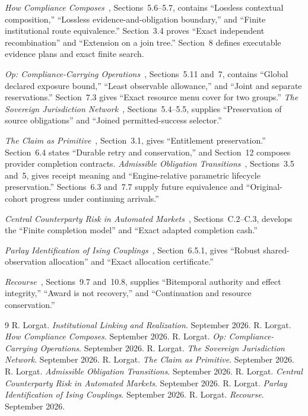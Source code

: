 \documentclass{momentum}
\begin{document}
\emph{How Compliance Composes}~\cite{compliance}, Sections~5.6--5.7, contains ``Lossless contextual composition,'' ``Lossless evidence-and-obligation boundary,'' and ``Finite institutional route equivalence.''
Section~3.4 proves ``Exact independent recombination'' and ``Extension on a join tree.''
Section~8 defines executable evidence plans and exact finite search.

\emph{Op: Compliance-Carrying Operations}~\cite{op}, Sections~5.11 and~7, contains ``Global declared exposure bound,'' ``Least observable allowance,'' and ``Joint and separate reservations.''
Section~7.3 gives ``Exact resource menu cover for two groups.''
\emph{The Sovereign Jurisdiction Network}~\cite{recognition}, Sections~5.4--5.5, supplies ``Preservation of source obligations'' and ``Joined permitted-success selector.''

\emph{The Claim as Primitive}~\cite{claim}, Section~3.1, gives ``Entitlement preservation.''
Section~6.4 states ``Durable retry and conservation,'' and Section~12 composes provider completion contracts.
\emph{Admissible Obligation Transitions}~\cite{transitions}, Sections~3.5 and~5, gives receipt meaning and ``Engine-relative parametric lifecycle preservation.''
Sections~6.3 and~7.7 supply future equivalence and ``Original-cohort progress under continuing arrivals.''

\emph{Central Counterparty Risk in Automated Markets}~\cite{risk}, Sections~C.2--C.3, develops the ``Finite completion model'' and ``Exact adapted completion cash.''

\emph{Parlay Identification of Ising Couplings}~\cite{parlay}, Section~6.5.1, gives ``Robust shared-observation allocation'' and ``Exact allocation certificate.''

\emph{Recourse}~\cite{recourse}, Sections~9.7 and~10.8, supplies ``Bitemporal authority and effect integrity,'' ``Award is not recovery,'' and ``Continuation and resource conservation.''

\begin{thebibliography}{9}
 R. Lorgat. \emph{Institutional Linking and Realization}. September 2026.
 R. Lorgat. \emph{How Compliance Composes}. September 2026.
 R. Lorgat. \emph{Op: Compliance-Carrying Operations}. September 2026.
 R. Lorgat. \emph{The Sovereign Jurisdiction Network}. September 2026.
 R. Lorgat. \emph{The Claim as Primitive}. September 2026.
 R. Lorgat. \emph{Admissible Obligation Transitions}. September 2026.
 R. Lorgat. \emph{Central Counterparty Risk in Automated Markets}. September 2026.
 R. Lorgat. \emph{Parlay Identification of Ising Couplings}. September 2026.
 R. Lorgat. \emph{Recourse}. September 2026.
\end{thebibliography}
\end{document}
